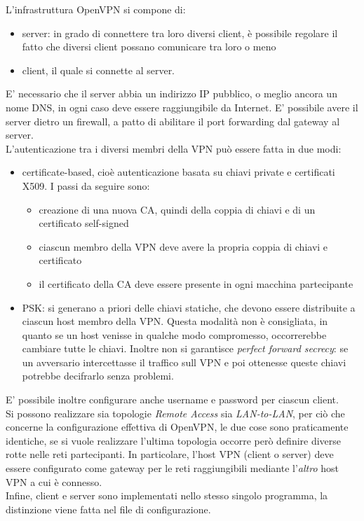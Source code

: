 L'infrastruttura OpenVPN si compone di:
\begin{itemize}
  \item server: in grado di connettere tra loro diversi client, è possibile regolare
  il fatto che diversi client possano comunicare tra loro o meno
  \item client, il quale si connette al server.
\end{itemize}
E' necessario che il server abbia un indirizzo IP pubblico, o meglio ancora un nome DNS, in ogni caso deve
essere raggiungibile da Internet.
E' possibile avere il server dietro un firewall, a patto di abilitare il port forwarding dal gateway al server.\\
L'autenticazione tra i diversi membri della VPN può essere fatta in due modi:
\begin{itemize}
  \item certificate-based, cioè autenticazione basata su chiavi private e certificati
  X509. I passi da seguire sono:
  \begin{itemize}
    \item creazione di una nuova CA, quindi della coppia di chiavi e di un certificato
    self-signed
    \item ciascun membro della VPN deve avere la propria coppia di chiavi e certificato
    \item il certificato della CA deve essere presente in ogni macchina partecipante
  \end{itemize}
  \item PSK: si generano a priori delle chiavi statiche, che devono essere distribuite
  a ciascun host membro della VPN. Questa modalità non è consigliata, in quanto
  se un host venisse in qualche modo compromesso, occorrerebbe cambiare tutte le chiavi.
  Inoltre non si garantisce \textit{perfect forward secrecy}: se un avversario
  intercettasse il traffico sull VPN e poi ottenesse queste chiavi potrebbe
  decifrarlo senza problemi.
\end{itemize}
E' possibile inoltre configurare anche username e password per ciascun client.\\
Si possono realizzare sia topologie \textit{Remote Access} sia \textit{LAN-to-LAN},
per ciò che concerne la configurazione effettiva di OpenVPN, le due cose
sono praticamente identiche, se si vuole realizzare l'ultima topologia occorre
però definire diverse rotte nelle reti partecipanti. In particolare,
l'host VPN (client o server) deve essere configurato come gateway per le reti
raggiungibili mediante l'\textit{altro} host VPN a cui è connesso.\\
Infine, client e server sono implementati
nello stesso singolo programma, la distinzione viene fatta nel file di configurazione.

